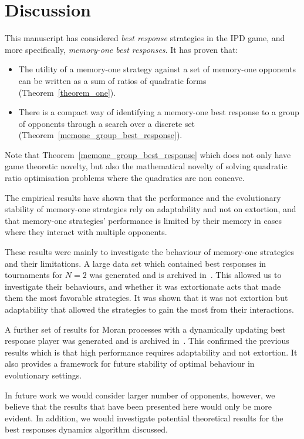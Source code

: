 \documentclass[10pt]{article}
\begin{document}
\section{Discussion}

This manuscript has considered \textit{best response} strategies in the IPD game, and
more specifically, \textit{memory-one best responses}. It has proven that:

\begin{itemize}
    \item The utility
          of a memory-one strategy against a set of memory-one opponents can be written as a sum
          of ratios of quadratic forms (Theorem~\ref{theorem_one}).
    \item There is a compact way of identifying a memory-one best response to a
        group of opponents through a search over a discrete set
        (Theorem~\ref{memone_group_best_response}).
\end{itemize}

Note that Theorem~\ref{memone_group_best_response} which does not only have game theoretic
novelty, but also the mathematical novelty of solving quadratic ratio optimisation
problems where the quadratics are non concave.

The empirical results have shown that the performance and the evolutionary
stability of memory-one strategies rely on adaptability and not on extortion,
and that memory-one strategies' performance is limited by their memory in cases
where they interact with multiple opponents.

These results were mainly to investigate the
behaviour of memory-one strategies and their limitations. A large data set which
contained best responses in tournaments for \(N=2\)
was generated and is archived in~\cite{glynatsi2019}. This allowed us to investigate their behaviours, and
whether it was extortionate acts that made them the most favorable strategies.
It was shown that it was not extortion but adaptability that allowed
the strategies to gain the most from their interactions.

A further set of results for Moran processes with a dynamically updating best
response player was generated and is archived in~\cite{}. %
This confirmed the previous results which is that high performance
requires adaptability and not extortion. It also provides a framework for future
stability of optimal behaviour in evolutionary settings.

In future work we would consider larger number of opponents, however, we
believe that the results that have been presented here
would only be more evident. In addition, we would investigate potential
theoretical results for the best responses dynamics algorithm
discussed.
\end{document}
